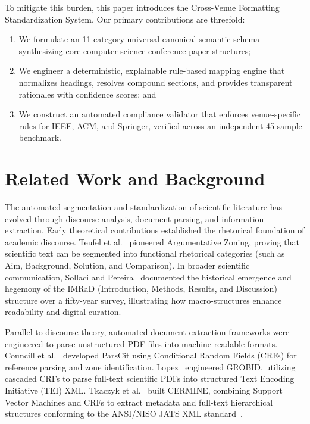 \documentclass[conference]{IEEEtran}
\begin{document}
To mitigate this burden, this paper introduces the Cross-Venue Formatting Standardization System. Our primary contributions are threefold:
\begin{enumerate}
    \item We formulate an 11-category universal canonical semantic schema synthesizing core computer science conference paper structures;
    \item We engineer a deterministic, explainable rule-based mapping engine that normalizes headings, resolves compound sections, and provides transparent rationales with confidence scores; and
    \item We construct an automated compliance validator that enforces venue-specific rules for IEEE, ACM, and Springer, verified across an independent 45-sample benchmark.
\end{enumerate}

\section{Related Work and Background}
The automated segmentation and standardization of scientific literature has evolved through discourse analysis, document parsing, and information extraction. Early theoretical contributions established the rhetorical foundation of academic discourse. Teufel et al.~\cite{teufel1999annotation} pioneered Argumentative Zoning, proving that scientific text can be segmented into functional rhetorical categories (such as Aim, Background, Solution, and Comparison). In broader scientific communication, Sollaci and Pereira~\cite{sollaci2004introduction} documented the historical emergence and hegemony of the IMRaD (Introduction, Methods, Results, and Discussion) structure over a fifty-year survey, illustrating how macro-structures enhance readability and digital curation.

Parallel to discourse theory, automated document extraction frameworks were engineered to parse unstructured PDF files into machine-readable formats. Councill et al.~\cite{councill2008parscit} developed ParsCit using Conditional Random Fields (CRFs) for reference parsing and zone identification. Lopez~\cite{lopez2009grobid} engineered GROBID, utilizing cascaded CRFs to parse full-text scientific PDFs into structured Text Encoding Initiative (TEI) XML. Tkaczyk et al.~\cite{tkaczyk2015cermine} built CERMINE, combining Support Vector Machines and CRFs to extract metadata and full-text hierarchical structures conforming to the ANSI/NISO JATS XML standard~\cite{jats2021}.
\end{document}
